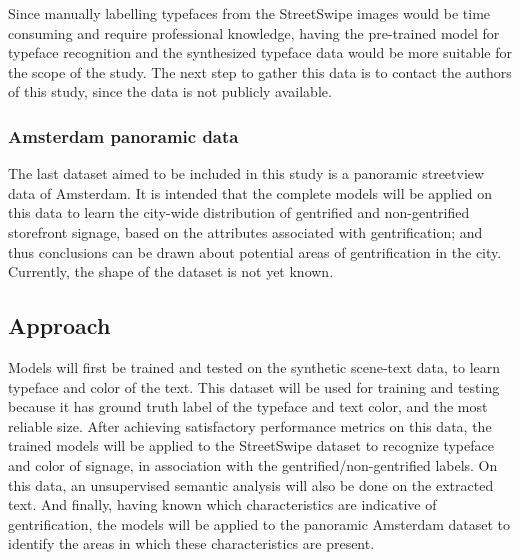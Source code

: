 Since manually labelling typefaces from the StreetSwipe images would be time consuming and require professional knowledge, having the pre-trained model for typeface recognition and the synthesized typeface data would be more suitable for the scope of the study. The next step to gather this data is to contact the authors of this study, since the data is not publicly available.

\subsubsection{Amsterdam panoramic data}
The last dataset aimed to be included in this study is a panoramic streetview data of Amsterdam. It is intended that the complete models will be applied on this data to learn the city-wide distribution of gentrified and non-gentrified storefront signage, based on the attributes associated with gentrification; and thus conclusions can be drawn about potential areas of gentrification in the city. Currently, the shape of the dataset is not yet known.

\subsection{Approach}
Models will first be trained and tested on the synthetic scene-text data, to learn typeface and color of the text. This dataset will be used for training and testing because it has ground truth label of the typeface and text color, and the most reliable size. After achieving satisfactory performance metrics on this data, the trained models will be applied to the StreetSwipe dataset to recognize typeface and color of signage, in association with the gentrified/non-gentrified labels. On this data, an unsupervised semantic analysis will also be done on the extracted text. And finally, having known which characteristics are indicative of gentrification, the models will be applied to the panoramic Amsterdam dataset to identify the areas in which these characteristics are present.


